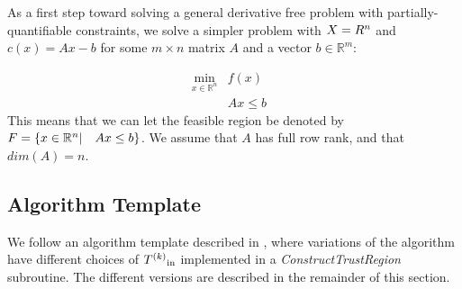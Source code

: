 As a first step toward solving a general derivative free problem with partially-quantifiable constraints,
we solve a simpler problem with $X = R^n$ and $c(x) = Ax-b$ for some $m\times n$ matrix $A$ and a vector $b\in \mathbb R^m$:

\[ \begin{array}{ccl} \min_{x \in \mathbb R^n} & f(x) \\
& Ax \le b & 
\end{array}
\]
This means that we can let the feasible region be denoted by ${F} = \{x \in \mathbb R^n | \quad  Ax \le b \}$.
We assume that $A$ has full row rank, and that  $dim(A) = n$.

\subsection{Algorithm Template}

We follow an algorithm template described in \cite{doi:10.1080/10556788.2015.1026968}, where variations of the algorithm have different choices of ${T^{(k)}}_{\text{in}}$ implemented in a \emph{ConstructTrustRegion} subroutine.
The different versions are described in the remainder of this section.



